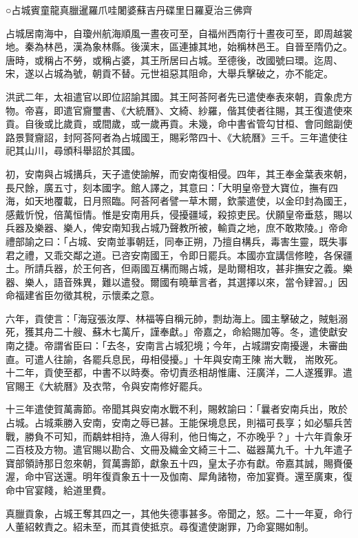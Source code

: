 
\begin{pinyinscope}
○占城賓童龍真臘暹羅爪哇闍婆蘇吉丹碟里日羅夏治三佛齊

占城居南海中，自瓊州航海順風一晝夜可至，自福州西南行十晝夜可至，即周越裳地。秦為林邑，漢為象林縣。後漢末，區連據其地，始稱林邑王。自晉至隋仍之。唐時，或稱占不勞，或稱占婆，其王所居曰占城。至德後，改國號曰環。迄周、宋，遂以占城為號，朝貢不替。元世祖惡其阻命，大舉兵擊破之，亦不能定。

洪武二年，太祖遣官以即位詔諭其國。其王阿荅阿者先已遣使奉表來朝，貢象虎方物。帝喜，即遣官齎璽書、《大統曆》、文綺、紗羅，偕其使者往賜，其王復遣使來貢。自後或比歲貢，或間歲，或一歲再貢。未幾，命中書省管勾甘桓、會同館副使路景賢齎詔，封阿荅阿者為占城國王，賜彩幣四十、《大統曆》三千。三年遣使往祀其山川，尋頒科舉詔於其國。

初，安南與占城搆兵，天子遣使諭解，而安南復相侵。四年，其王奉金葉表來朝，長尺餘，廣五寸，刻本國字。館人譯之，其意曰：「大明皇帝登大寶位，撫有四海，如天地覆載，日月照臨。阿荅阿者譬一草木爾，欽蒙遣使，以金印封為國王，感戴忻悅，倍萬恒情。惟是安南用兵，侵擾疆域，殺掠吏民。伏願皇帝垂慈，賜以兵器及樂器、樂人，俾安南知我占城乃聲教所被，輸貢之地，庶不敢欺陵。」帝命禮部諭之曰：「占城、安南並事朝廷，同奉正朔，乃擅自構兵，毒害生靈，既失事君之禮，又乖交鄰之道。已咨安南國王，令即日罷兵。本國亦宜講信修睦，各保疆土。所請兵器，於王何吝，但兩國互構而賜占城，是助爾相攻，甚非撫安之義。樂器、樂人，語音殊異，難以遣發。爾國有曉華言者，其選擇以來，當令肄習。」因命福建省臣勿徵其稅，示懷柔之意。

六年，貢使言：「海寇張汝厚、林福等自稱元帥，剽劫海上。國主擊破之，賊魁溺死，獲其舟二十艘、蘇木七萬斤，謹奉獻。」帝嘉之，命給賜加等。冬，遣使獻安南之捷。帝謂省臣曰：「去冬，安南言占城犯境；今年，占城謂安南擾邊，未審曲直。可遣人往諭，各罷兵息民，毋相侵擾。」十年與安南王陳耑大戰，耑敗死。十二年，貢使至都，中書不以時奏。帝切責丞相胡惟庸、汪廣洋，二人遂獲罪。遣官賜王《大統曆》及衣幣，令與安南修好罷兵。

十三年遣使賀萬壽節。帝聞其與安南水戰不利，賜敕諭曰：「曩者安南兵出，敗於占城。占城乘勝入安南，安南之辱已甚。王能保境息民，則福可長享；如必驅兵苦戰，勝負不可知，而鷸蚌相持，漁人得利，他日悔之，不亦晚乎？」十六年貢象牙二百枝及方物。遣官賜以勘合、文冊及織金文綺三十二、磁器萬九千。十九年遣子寶部領詩那日忽來朝，賀萬壽節，獻象五十四，皇太子亦有獻。帝嘉其誠，賜賚優渥，命中官送還。明年復貢象五十一及伽南、犀角諸物，帝加宴賚。還至廣東，復命中官宴餞，給道里費。

真臘貢象，占城王奪其四之一，其他失德事甚多。帝聞之，怒。二十一年夏，命行人董紹敕責之。紹未至，而其貢使抵京。尋復遣使謝罪，乃命宴賜如制。


\end{pinyinscope}
